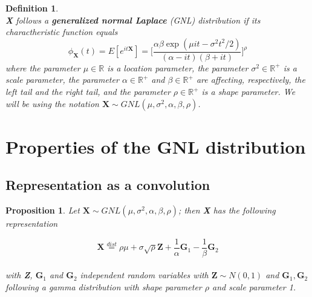 \documentclass[12pt,travaildirige,nobabel, twoside]{dms}
\numberwithin{equation}{section}
\numberwithin{table}{chapter}
\numberwithin{figure}{chapter}
\newtheorem{mydef}{Definition}[section]
\newtheorem{proposition}{Proposition}[section]
\begin{document}
\begin{mydef}\leavevmode \\
\textbf{X} follows a \textbf{generalized normal Laplace} (GNL) distribution if its charactheristic function equals \\
\begin{equation}\label{eq:cf} \phi_\textbf{X}(t)=E[e^{it\textbf{X}}]=\bigg[\frac{\alpha \beta \exp({\mu it-\sigma ^2 t^2/2})}{(\alpha-it)(\beta+it)}\bigg]^{\rho} \end{equation} 
\noindent
where the parameter $\mu\in\mathbb{R}$ is a location parameter, the parameter $\sigma^2\in\mathbb{R}^+$ is a scale parameter, the parameter $\alpha\in\mathbb{R}^+$ and $\beta\in\mathbb{R}^+$ are affecting, respectively, the left tail and the right tail, and the parameter $\rho\in\mathbb{R}^+$ is a shape parameter. We will be using the notation \begin{math}\textbf{X}\sim GNL( \mu,\sigma^2,\alpha, \beta,\rho)\end{math}\nocite{distquadGNL}. \\

\end{mydef}



\section{Properties of the GNL distribution}

\subsection{Representation as a convolution}

\begin{proposition}\label{eq:convolution}
Let $\textbf{X}\sim GNL(\mu,\sigma^2,\alpha,\beta,\rho)$; then \textbf{X} has the following representation

\begin{equation}
\textbf{X}\stackrel{dist}{=}\rho\mu + \sigma\sqrt{\rho}\textbf{Z}+\frac{1}{\alpha}\textbf{G}_1-\frac{1}{\beta}\textbf{G}_2 
\end{equation}\\ with \textbf{Z}, $\textbf{G}_1$ and $\textbf{G}_2$  independent random variables with $\textbf{Z}\sim N(0,1)$ and $\textbf{G}_1,\textbf{G}_2$ following a gamma distribution with shape parameter $\rho$ and scale parameter 1\nocite{distquadGNL}.
\end{proposition}
\end{document}
